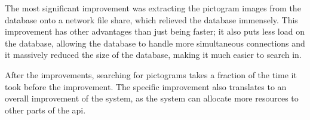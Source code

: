 The most significant improvement was extracting the pictogram images from the database onto a network file share, which relieved the database immensely. This improvement has other advantages than just being faster; it also puts less load on the database, allowing the database to handle more simultaneous connections and it massively reduced the size of the database, making it much easier to search in.

After the improvements, searching for pictograms takes a fraction of the time it took before the improvement. The specific improvement also translates to an overall improvement of the system, as the system can allocate more resources to other parts of the \gls{api}.
